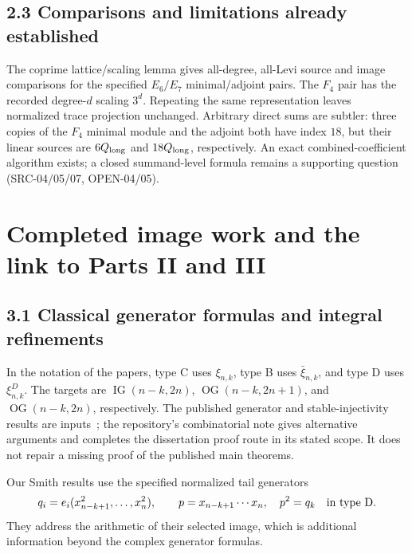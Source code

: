 \documentclass[11pt,letterpaper]{article}
\newcommand{\OG}{\operatorname{OG}}
\newcommand{\IG}{\operatorname{IG}}
\begin{document}
\subsection*{2.3 Comparisons and limitations already established}
The coprime lattice/scaling lemma gives all-degree, all-Levi source and
image comparisons for the specified \(E_6/E_7\) minimal/adjoint pairs.
The \(F_4\) pair has the recorded degree-\(d\) scaling \(3^d\).
Repeating the same representation leaves normalized trace projection
unchanged. Arbitrary direct sums are subtler: three copies of the \(F_4\)
minimal module and the adjoint both have index \(18\), but their linear
sources are \(6Q_{\rm long}\) and \(18Q_{\rm long}\), respectively.
An exact combined-coefficient algorithm exists; a closed summand-level
formula remains a supporting question (SRC-04/05/07, OPEN-04/05).

\newpage
\section{Completed image work and the link to Parts II and III}
\subsection*{3.1 Classical generator formulas and integral refinements}
In the notation of the papers, type C uses \(\xi_{n,k}\), type B uses
\(\bar\xi_{n,k}\), and type D uses \(\xi^D_{n,k}\).
The targets are \(\IG(n-k,2n)\), \(\OG(n-k,2n+1)\), and
\(\OG(n-k,2n)\), respectively. The published generator and stable-injectivity
results are inputs~\cite{KR,KX}; the repository's combinatorial note gives
alternative arguments and completes the dissertation proof route in its
stated scope. It does not repair a missing proof of the published main theorems.

Our Smith results use the specified normalized tail generators
\[
 q_i=e_i(x_{n-k+1}^2,\ldots,x_n^2),\qquad
 p=x_{n-k+1}\cdots x_n,\quad p^2=q_k\quad\hbox{in type D}.
\]
They address the arithmetic of their selected image, which is additional
information beyond the complex generator formulas.
\end{document}

